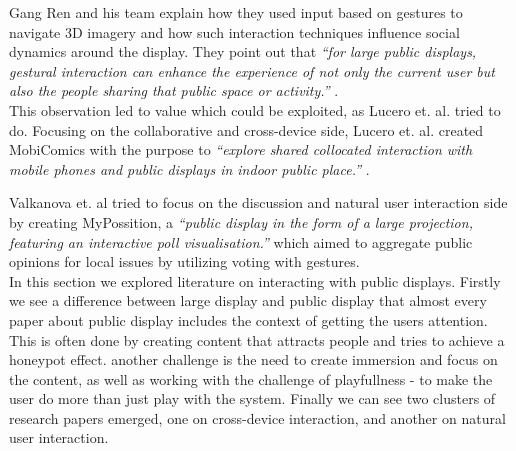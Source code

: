 Gang Ren and his team explain how they used input based on gestures to navigate 3D imagery and how such interaction techniques influence social dynamics around the display. 
They point out that\emph{ ``for large public displays, gestural interaction can enhance the experience of not only the current user but also the people sharing that public space or activity.''} \cite{Ren:2013}.\\

This observation led to value which could be exploited, as Lucero et. al. tried to do. 
Focusing on the collaborative and cross-device side, Lucero et. al. created MobiComics with the purpose to \emph{``explore shared collocated interaction with mobile phones and public displays in indoor public place.''} \cite{Lucero:2012}. 

Valkanova et. al tried to focus on the discussion and natural user interaction side by creating MyPossition, a \emph{``public display in the form of a large projection, featuring an interactive poll visualisation.''} \cite{Valkanova:2014} which aimed to aggregate public opinions for local issues by utilizing voting with gestures.\\

In this section we explored literature on interacting with public displays. Firstly we see a difference between large display and public display that almost every paper about public display includes the context of getting the users attention. This is often done by creating content that attracts people and tries to achieve a honeypot effect. another challenge  is the need to create immersion and focus on the content, as well as  working with the challenge of playfullness - to make the user do more than just play with the system. Finally we can see two clusters of research papers emerged, one on cross-device interaction, and another on natural user interaction.
